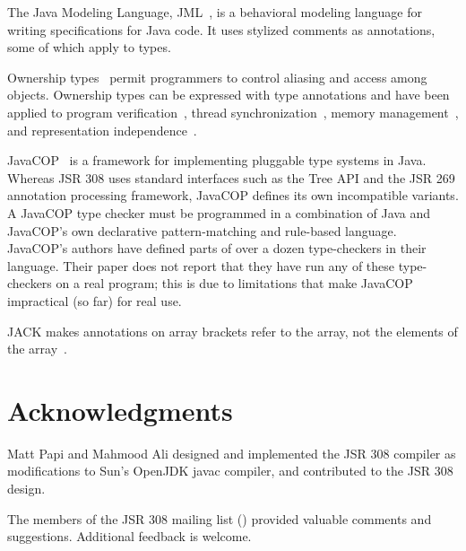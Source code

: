 \documentclass[10pt]{article}
\begin{document}
The Java Modeling Language, JML~\cite{LeavensBR2006:JML}, is a behavioral
modeling language for writing specifications for Java code.  It uses
stylized comments as annotations, some of which apply to types.


Ownership types~\cite{ClarkePN98,Boyapati2004:PhD,Clark2001,ClarkD2002,PotaninNCB2006,NobleVP98,DietlM2005,LeinoM2004,YuP2006}
permit programmers to control aliasing and access among objects.  Ownership
types can be expressed with type annotations
and have been applied to program
verification~\cite{LeinoM2004,Muller2002,MullerPHL2006}, thread
synchronization~\cite{BoyapatiLR2002,JacobsPLS2005}, memory
management~\cite{AndreaCGNVZ2006,BoyapatiSBR2003}, and representation
independence~\cite{BanerjeeN2002}.


JavaCOP~\cite{AndreaeNMM2006} is a framework for implementing pluggable
type systems in Java.  Whereas JSR 308 uses standard
interfaces such as the Tree API and the JSR 269 annotation processing
framework, JavaCOP defines its own incompatible variants.
A JavaCOP type checker must be programmed in a combination of Java and
JavaCOP's own declarative pattern-matching and rule-based language.
JavaCOP's authors have defined parts of over a dozen
type-checkers in their language.  Their paper does not report that they have
run any of these type-checkers on a real program; this is due to
limitations that make JavaCOP impractical (so far) for real use.


JACK makes annotations on array brackets refer to the array, not the
elements of the array~\cite{MalePPD2008}.


\section*{Acknowledgments}

Matt Papi and Mahmood Ali designed and implemented the JSR 308 compiler as
modifications to Sun's OpenJDK javac compiler, and contributed to the JSR
308 design.

The members of the JSR 308 mailing list
() provided
valuable comments and suggestions.
%
Additional feedback is welcome.
\end{document}

